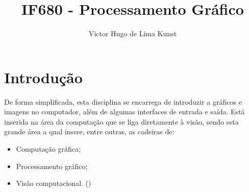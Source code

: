 \documentclass[10 pt,a4paper]{article}
\title{IF680 - Processamento Gráfico}
\author{Victor Hugo de Lima Kunst}
\begin{document}
\maketitle
\section*{Introdução}
De forma simplificada, esta disciplina se encarrega de introduzir a gráficos e imagens no computador, além de algumas interfaces de entrada e saída.
\linebreak
Está inserida na área da computação que se liga diretamente à visão, sendo esta grande área a qual insere, entre outras, as cadeiras de:
\begin{itemize}
\item Computação gráfica;
\item Processamento gráfico;
\item Visão computacional.
(\cite{sitePet})
\end{itemize}
\end{document}
